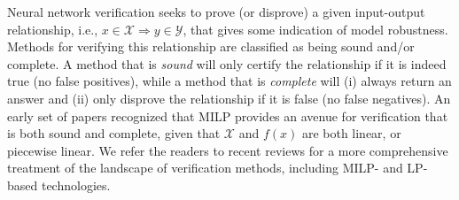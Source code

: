 Neural network verification seeks to prove (or disprove) a given input-output relationship, i.e., $x \in \mathcal{X} \Rightarrow y \in \mathcal{Y}$, that gives some indication of model robustness. 
Methods for verifying this relationship are classified as being sound and/or complete. 
A method that is \textit{sound} will only certify the relationship if it is indeed true (no false positives), while a method that is \textit{complete} will (i) always return an answer and (ii) only disprove the relationship if it is false (no false negatives). 
An early set of papers \citep{FischettiMIP,LomuscioMIP,tjeng2017evaluating} recognized that MILP provides an avenue for verification that is both sound and complete, given that $\mathcal{X}$ and $f(x)$ are both linear, or piecewise linear. 
We refer the readers to recent reviews \citep{huang2020survey,leofante2018automated,li2022sok,liu2021algorithms} for a more comprehensive treatment of the landscape of verification methods, including MILP- and LP-based technologies.



